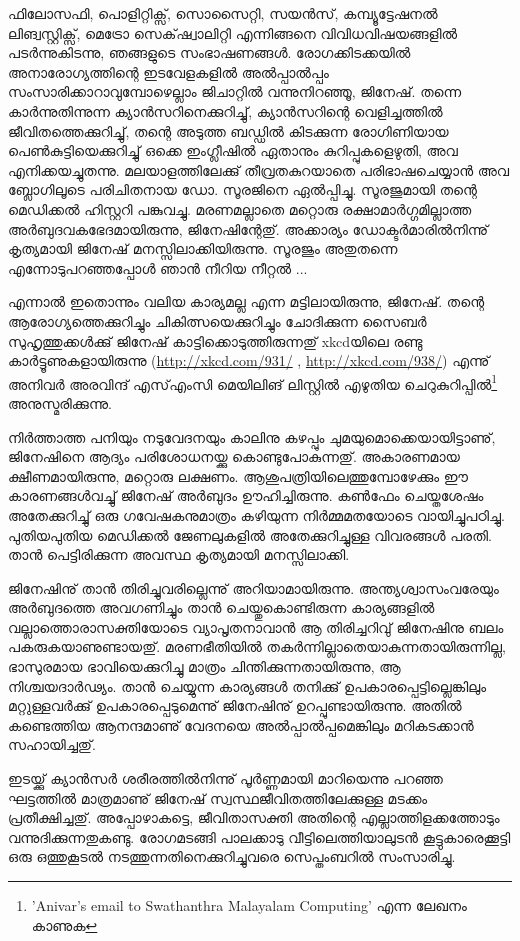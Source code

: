ഫിലോസഫി, പൊളിറ്റിക്സ്, സൊസൈറ്റി, സയന്‍സ്, കമ്പ്യൂട്ടേഷനല്‍ ലിങ്വസ്റ്റിക്സ്, മെട്രോ സെക്‌ഷ്വാലിറ്റി എന്നിങ്ങനെ വിവിധവിഷയങ്ങളില്‍ 
പടര്‍ന്നുകിടന്നു, ഞങ്ങളുടെ സംഭാഷണങ്ങള്‍. രോഗക്കിടക്കയില്‍ അനാരോഗ്യത്തിന്റെ ഇടവേളകളില്‍ 
അല്‍പ്പാല്‍പ്പം സംസാരിക്കാറാവുമ്പോഴെല്ലാം ജിചാറ്റില്‍ വന്നുനിറഞ്ഞൂ, ജിനേഷ്. തന്നെ കാര്‍ന്നുതിന്നുന്ന ക്യാന്‍സറിനെക്കുറിച്ചു്, 
ക്യാന്‍സറിന്റെ വെളിച്ചത്തില്‍ ജീവിതത്തെക്കുറിച്ചു്, തന്റെ അടുത്ത ബഡ്ഡില്‍ കിടക്കുന്ന രോഗിണിയായ പെണ്‍കുട്ടിയെക്കുറിച്ചു് 
ഒക്കെ ഇംഗ്ലീഷില്‍ ഏതാനും കുറിപ്പുകളെഴുതി, അവ എനിക്കയച്ചുതന്നു. മലയാളത്തിലേക്കു് തീവ്രതകുറയാതെ പരിഭാഷചെയ്യാന്‍ 
അവ ബ്ലോഗിലൂടെ പരിചിതനായ ഡോ. സൂരജിനെ ഏല്‍പ്പിച്ചു. സൂരജുമായി തന്റെ മെഡിക്കല്‍ ഹിസ്റ്ററി പങ്കുവച്ചു. മരണമല്ലാതെ 
മറ്റൊരു രക്ഷാമാര്‍ഗ്ഗമില്ലാത്ത അര്‍ബുദവകഭേദമായിരുന്നു, ജിനേഷിന്റേതു്. അക്കാര്യം ഡോക്ടര്‍മാരില്‍നിന്നു് കൃത്യമായി 
ജിനേഷ് മനസ്സിലാക്കിയിരുന്നു. സൂരജും അതുതന്നെ എന്നോടുപറഞ്ഞപ്പോള്‍ ഞാന്‍ നീറിയ നീറ്റല്‍ ...

എന്നാല്‍ ഇതൊന്നും വലിയ കാര്യമല്ല എന്ന മട്ടിലായിരുന്നു, ജിനേഷ്. തന്റെ ആരോഗ്യത്തെക്കുറിച്ചും ചികിത്സയെക്കുറിച്ചും 
ചോദിക്കുന്ന സൈബര്‍ സുഹൃത്തുക്കള്‍ക്കു് ജിനേഷ് കാട്ടിക്കൊടുത്തിരുന്നതു് xkcdയിലെ രണ്ടു കാര്‍ട്ടൂണുകളായിരുന്നു 
(\url{http://xkcd.com/931/}  , \url{http://xkcd.com/938/}) എന്നു് അനിവര്‍ അരവിന്ദ് എസ്എംസി മെയിലിങ് ലിസ്റ്റില്‍ എഴുതിയ 
ചെറുകുറിപ്പില്‍\footnote{'Anivar's email to Swathanthra Malayalam Computing' എന്ന ലേഖനം കാണുക} അനുസ്മരിക്കുന്നു. 

നിര്‍ത്താത്ത പനിയും നടുവേദനയും കാലിനു കഴപ്പും ചുമയുമൊക്കെയായിട്ടാണു്, ജിനേഷിനെ ആദ്യം പരിശോധനയ്ക്കു 
കൊണ്ടുപോകുന്നതു്. അകാരണമായ ക്ഷീണമായിരുന്നു, മറ്റൊരു ലക്ഷണം. ആശുപത്രിയിലെത്തുമ്പോഴേക്കും ഈ 
കാരണങ്ങള്‍വച്ചു് ജിനേഷ് അര്‍ബുദം ഊഹിച്ചിരുന്നു. കണ്‍ഫേം ചെയ്തശേഷം അതേക്കുറിച്ചു് ഒരു ഗവേഷകനുമാത്രം 
കഴിയുന്ന നിര്‍മ്മമതയോടെ വായിച്ചുപഠിച്ചു. പുതിയപുതിയ മെഡിക്കല്‍ ജേണലുകളില്‍ അതേക്കുറിച്ചുള്ള വിവരങ്ങള്‍ പരതി. 
താന്‍ പെട്ടിരിക്കുന്ന അവസ്ഥ കൃത്യമായി മനസ്സിലാക്കി.

ജിനേഷിനു് താന്‍ തിരിച്ചുവരില്ലെന്നു് അറിയാമായിരുന്നു. അന്ത്യശ്വാസംവരേയും അര്‍ബുദത്തെ അവഗണിച്ചും താന്‍ 
ചെയ്തുകൊണ്ടിരുന്ന കാര്യങ്ങളില്‍ വല്ലാത്തൊരാസക്തിയോടെ വ്യാപൃതനാവാന്‍ ആ തിരിച്ചറിവു് ജിനേഷിനു ബലം 
പകരുകയാണുണ്ടായതു്. മരണഭീതിയില്‍ തകര്‍ന്നില്ലാതെയാകുന്നതായിരുന്നില്ല, ഭാസുരമായ ഭാവിയെക്കുറിച്ചു മാത്രം 
ചിന്തിക്കുന്നതായിരുന്നു, ആ നിശ്ചയദാര്‍ഢ്യം. താന്‍ ചെയ്യുന്ന കാര്യങ്ങള്‍ തനിക്കു് ഉപകാരപ്പെട്ടില്ലെങ്കിലും മറ്റുള്ളവര്‍ക്കു് 
ഉപകാരപ്പെടുമെന്നു് ജിനേഷിനു് ഉറപ്പുണ്ടായിരുന്നു. അതില്‍ കണ്ടെത്തിയ ആനന്ദമാണു് വേദനയെ അല്‍പ്പാല്‍പ്പമെങ്കിലും 
മറികടക്കാന്‍ സഹായിച്ചതു്.

ഇടയ്ക്കു് ക്യാന്‍സര്‍ ശരീരത്തില്‍നിന്നു് പൂര്‍ണ്ണമായി മാറിയെന്നു പറഞ്ഞ ഘട്ടത്തില്‍ മാത്രമാണു് ജിനേഷ് 
സ്വസ്ഥജീവിതത്തിലേക്കുള്ള മടക്കം പ്രതീക്ഷിച്ചതു്. അപ്പോഴാകട്ടെ, ജീവിതാസക്തി അതിന്റെ എല്ലാത്തിളക്കത്തോടും 
വന്നുദിക്കുന്നതുകണ്ടു. രോഗമടങ്ങി പാലക്കാടു വീട്ടിലെത്തിയാലുടന്‍ കൂട്ടുകാരെക്കൂട്ടി ഒരു ഒത്തുകൂടല്‍ നടത്തുന്നതിനെക്കുറിച്ചുവരെ 
സെപ്തംബറില്‍ സംസാരിച്ചു.

